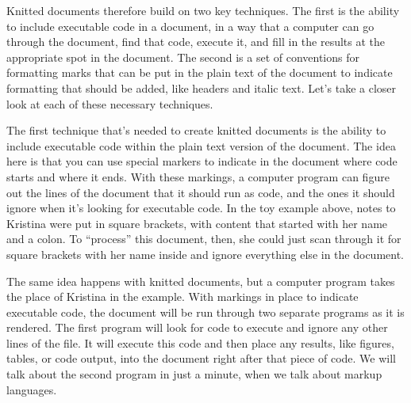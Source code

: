 \documentclass[]{tufte-book}
\begin{document}
Knitted documents therefore build on two key techniques. The first is the
ability to include executable code in a document, in a way that a computer can
go through the document, find that code, execute it, and fill in the results at
the appropriate spot in the document. The second is a set of conventions for
formatting marks that can be put in the plain text of the document to indicate
formatting that should be added, like headers and italic text. Let's take a closer
look at each of these necessary techniques.

The first technique that's needed to create knitted documents is the ability to
include executable code within the plain text version of the document.
The idea here is that you can use special markers to indicate in the document
where code starts and where it ends. With these markings, a computer program can
figure out the lines of the document that it should run as code, and the ones it
should ignore when it's looking for executable code. In the toy example above,
notes to Kristina were put in square brackets, with content that started with
her name and a colon. To ``process'' this document, then, she could just scan
through it for square brackets with her name inside and ignore everything else
in the document.

The same idea happens with knitted documents, but a computer program takes the
place of Kristina in the example. With markings in place to indicate executable
code, the document will be run through two separate programs as it is rendered.
The first program will look for code to execute and ignore any other lines of
the file. It will execute this code and then place any results, like figures,
tables, or code output, into the document right after that piece of code. We
will talk about the second program in just a minute, when we talk about markup
languages.
\end{document}
